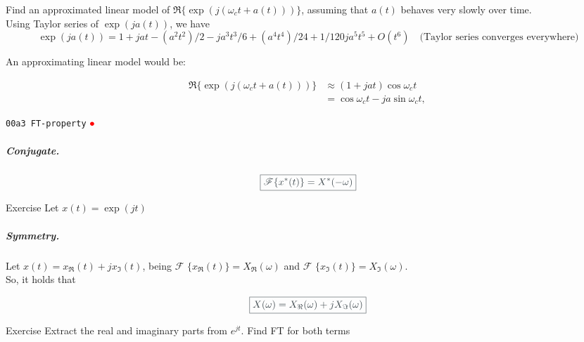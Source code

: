 \documentclass[17pt,a4paper]{extarticle}
\newcommand{\gc}[1]{\textcolor[rgb]{1.00,0.00,0.00}{#1}}
\newcommand{\cita}[1]{\textcolor[rgb]{0.23, 0.27, 0.29}{\boxed{{\Large #1}}}}
\newcommand{\alp}[1]{\textcolor[rgb]{0.00,0.00,1.00}{\small\texttt{#1}}}
\newcommand{\labelpethau}[1]{\texttt{#1}:}
\newlength\normalparindent
\newenvironment{pethau}%
{\begin{list}{}%
		{\renewcommand{\makelabel}{\labelpethau}%
			\setlength{\itemindent}{0pt}%
			\setlength{\leftmargin}{0pt}%
			\setlength{\labelwidth}{-1\normalparindent}%
			\addtolength{\topsep}{-0.5\parskip}%
			\listparindent \normalparindent
			\setlength{\parsep}{\parskip}}}%
	{\end{list}}
\begin{document}
\begin{example}
Find an approximated linear model of $\Re\{\exp(j(\omega_ct +a(t)))\}$, assuming that $a(t)$ behaves very slowly over time. 
\\
Using Taylor series of $\exp(ja(t))$, we have
$$\exp(ja(t)) = 1 + j a t - (a^{2} t^2)/2 - j a^3 t^3/6 + (a^4 t^4)/24 + 1/120 j a^5 t^5 + O(t^6)\quad
\textrm{(Taylor series converges everywhere)}$$

An approximating linear model would be: 
\begin{linenomath*}\begin{align*}\Re\{\exp(j(\omega_ct +a(t)))\} &\approx (1 + j a t ) \cos \omega_c t \\&= \cos \omega_ct - j a \sin \omega_ct,\, 
\end{align*}\end{linenomath*}
\end{example}

\clearpage
{\alp{00a3 FT-property}}
\href{https://deepnote.com/workspace/gcpds-76307f69-c109-4b50-8818-29b8600ffe98/project/Fundamentals-ef1064c8-5ffe-4039-a3f4-6f71bb3de118/notebook/00a3%20FT-property-0003ea3ba9c34f42bea9baf0854c682d}{$\gc{\bullet}$}
\subparagraph{\textit{Conjugate.}}
	\begin{linenomath*}\begin{equation*}
	\cita{\mathscr{F}\{x^{\ast}(t)\}=X^{\ast}(-\omega)}
	\end{equation*} \end{linenomath*}
\begin{pethau}
	\item[Exercise] Let $x(t)= \exp(jt)$\\
\end{pethau}

\subparagraph{\textit{Symmetry.}} Let $x(t)=x_{\Re}(t)+jx_{\Im}(t)$, being $\mathscr{F}$ $\{x_{\Re}(t)\}=X_{\Re}(\omega)$ and $\mathscr{F}$ $\{x_{\Im
}(t)\}=X_{\Im}(\omega).$ \\
So, it holds that 
\begin{linenomath*}\begin{equation*}
		\cita{X(\omega)= X_{\Re}(\omega)+jX_{\Im}(\omega)}
\end{equation*} \end{linenomath*}

\begin{pethau}
	\item[Exercise] Extract the real and imaginary parts from $e^{jt}$. Find FT for both terms
\end{pethau}
\end{document}
